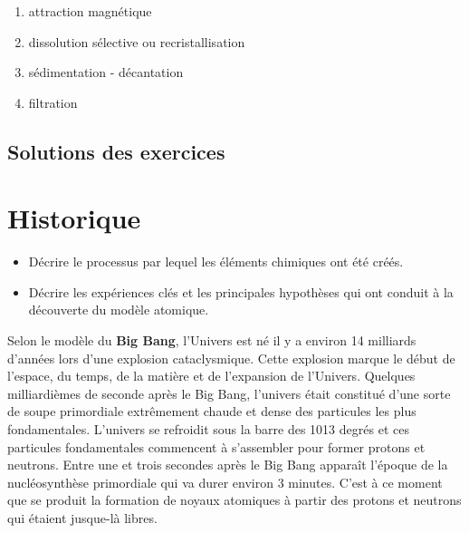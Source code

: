 \documentclass[
  11pt,
  french,
  a4paper,
  openany]{book}
\providecommand{\tightlist}{%
  \setlength{\itemsep}{0pt}\setlength{\parskip}{0pt}}
\begin{document}
\begin{Answer}

\begin{enumerate}
\def\labelenumi{\arabic{enumi}.}
\tightlist
\item
  attraction magnétique
\item
  dissolution sélective ou recristallisation
\item
  sédimentation - décantation
\item
  filtration
\end{enumerate}


\end{Answer}

\newpage

\section{Solutions des exercices} \shipoutAnswer

\hypertarget{historique}{%
\chapter{Historique}\label{historique}}

\begin{objectives}

\begin{itemize}
\tightlist
\item
  Décrire le processus par lequel les éléments chimiques ont été créés.
\item
  Décrire les expériences clés et les principales hypothèses qui ont conduit à la découverte du modèle atomique.
\end{itemize}


\end{objectives}

Selon le modèle du \textbf{Big Bang}, l'Univers est né il y a environ 14 milliards d'années lors d'une explosion cataclysmique. Cette explosion marque le début de l'espace, du temps, de la matière et de l'expansion de l'Univers. Quelques milliardièmes de seconde après le Big Bang, l'univers était constitué d'une sorte de soupe primordiale extrêmement chaude et dense des particules les plus fondamentales. L'univers se refroidit sous la barre des 1013 degrés et ces particules fondamentales commencent à s'assembler pour former protons et neutrons. Entre une et trois secondes après le Big Bang apparaît l'époque de la nucléosynthèse primordiale qui va durer environ 3 minutes. C'est à ce moment que se produit la formation de noyaux atomiques à partir des protons et neutrons qui étaient jusque-là libres.
\end{document}
